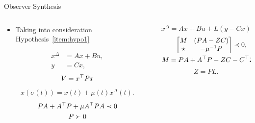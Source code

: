 \begin{slide}{Observer Synthesis}
  \begin{columns}[c]
    \begin{column}{0.55\textwidth}
      \begin{itemize}
        \item Taking into consideration Hypothesis~\ref{item:hypo1}
      \end{itemize}
      \begin{align}
        x^{\Delta} & = Ax + Bu, \\
        y          & = Cx,
      \end{align}
      \begin{gather}
        V = x^{\top}{}Px
      \end{gather}
      \begin{gather}
        x(\sigma(t)) = x(t) + \mu(t)x^{\Delta}(t).
      \end{gather}
      \begin{gather}
        PA + A^{\top}{}P + \mu{}A^{\top}{}PA \prec{} 0 \\
        P \succ{} 0
      \end{gather}
    \end{column}%
    \hfill%
    \begin{column}{0.55\textwidth}
      \begin{equation}
        x^{\Delta} = Ax + Bu + L(y - Cx).
      \end{equation}
      \begin{gather}
        \begin{bmatrix}
          M     & (PA - ZC)  \\
          \star & -\mu^{-1}P
        \end{bmatrix} \prec{} 0,  \\
        M = PA + A^{\top}{}P - ZC - C^{\top}{}Z^{\top}{}.
      \end{gather}
      \begin{equation}
        Z = PL.
      \end{equation}
    \end{column}%
  \end{columns}
\end{slide}

